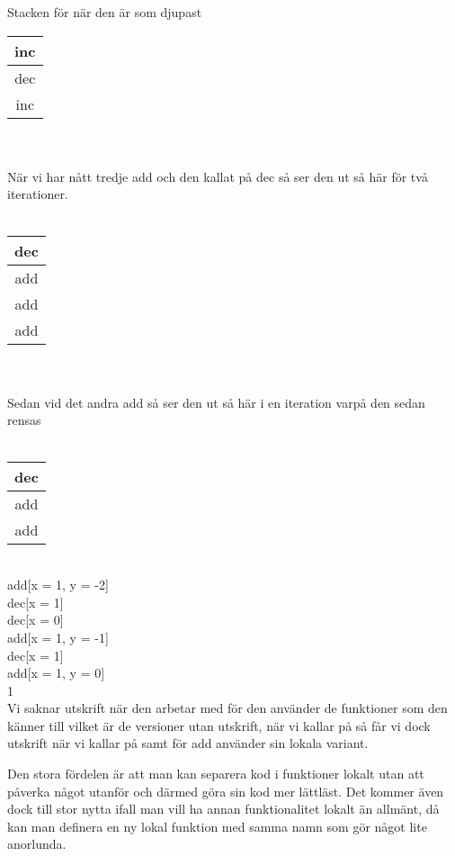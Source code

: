 \Subtask
Stacken för  när den är som djupast

\begin{tabular}{|c|}
\hline
inc \\
\hline
dec\\
\hline
inc \\
\hline
\end{tabular}
\\
\\
När vi har nått tredje add och den kallat på dec så ser den ut så här för två iterationer.
\\
\\
\begin{tabular}{|c|}

\hline
dec \\
\hline
add \\
\hline
add\\
\hline
add \\
\hline
\end{tabular}
\\
\\
Sedan vid det andra add så ser den ut så här i en iteration varpå den sedan rensas
\\
\\
\begin{tabular}{|c|}

\hline
dec \\
\hline
add \\
\hline
add\\
\hline
\end{tabular}

\Task

\\
add[x = 1, y = -2]\\
dec[x = 1]\\
dec[x = 0]\\
add[x = 1, y = -1]\\
dec[x = 1]\\
add[x = 1, y = 0]\\
1\\
Vi saknar utskrift när den arbetar med  för den använder de funktioner som den känner till vilket är de versioner utan utskrift, när vi kallar på  så får vi dock utskrift när vi kallar på  samt  för add använder sin lokala variant.

\Subtask
Den stora fördelen är att man kan separera kod i funktioner lokalt utan att påverka något utanför och därmed göra sin kod mer lättläst. Det kommer även dock till stor nytta ifall man vill ha annan funktionalitet lokalt än allmänt, då kan man definera en ny lokal funktion med samma namn som gör något lite anorlunda.

